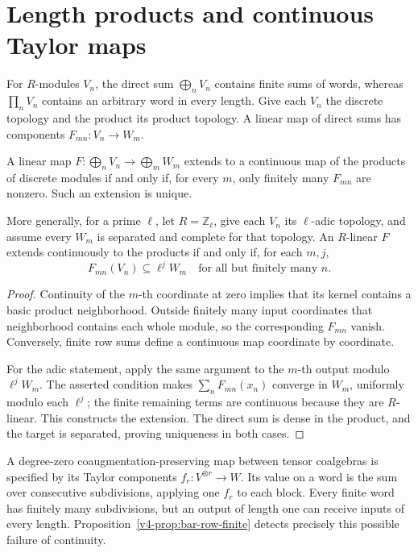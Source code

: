 \section{Length products and continuous Taylor maps}
\label{v4-sec:bar-length-completion}

For \(R\)-modules \(V_n\), the direct sum \(\bigoplus_nV_n\) contains
finite sums of words, whereas \(\prod_nV_n\) contains an arbitrary
word in every length. Give each \(V_n\) the discrete topology and
the product its product topology. A linear map of direct sums
has components \(F_{mn}:V_n\to W_m\).

\begin{proposition}\label{v4-prop:bar-row-finite}
A linear map \(F:\bigoplus_nV_n\to\bigoplus_mW_m\) extends to
a continuous map of the products of discrete modules if and only
if, for every \(m\), only finitely many \(F_{mn}\) are nonzero.
Such an extension is unique.

More generally, for a prime \(\ell\), let \(R=\mathbb Z_\ell\), give each \(V_n\) its
\(\ell\)-adic topology, and assume every \(W_m\) is separated
and complete for that topology. An \(R\)-linear \(F\) extends
continuously to the products if and only if, for each \(m,j\),
\[
 F_{mn}(V_n)\subseteq\ell^jW_m
       \quad\text{for all but finitely many }n.
\]
\end{proposition}

\begin{proof}
Continuity of the \(m\)-th coordinate at zero implies that its
kernel contains a basic product neighborhood. Outside finitely
many input coordinates that neighborhood contains each whole
module, so the corresponding \(F_{mn}\) vanish. Conversely,
finite row sums define a continuous map coordinate by coordinate.

For the adic statement, apply the same argument to the \(m\)-th
output modulo \(\ell^jW_m\). The asserted condition makes
\(\sum_nF_{mn}(x_n)\) converge in \(W_m\), uniformly modulo each
\(\ell^j\); the finite remaining terms are continuous because
they are \(R\)-linear. This constructs the extension. The direct
sum is dense in the product, and the target is separated, proving
uniqueness in both cases.
\end{proof}

A degree-zero coaugmentation-preserving map between tensor
coalgebras is specified by its Taylor components
\(f_r:V^{\otimes r}\to W\). Its value on a
word is the sum over consecutive subdivisions, applying one
\(f_r\) to each block. Every finite word has finitely many
subdivisions, but an output of length one can receive inputs of
every length. Proposition~\ref{v4-prop:bar-row-finite} detects
precisely this possible failure of continuity.


